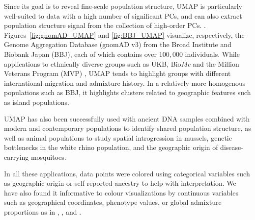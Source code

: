 \documentclass[12pt]{article}
\begin{document}
Since its goal is to reveal fine-scale population structure, UMAP is particularly well-suited to data with a high number of significant PCs, and can also extract population structure signal from the collection of high-order PCs. \cite{diaz-papkovich_umap_2019}.  Figures~\ref{fig:gnomAD_UMAP} and \ref{fig:BBJ_UMAP} visualize, respectively, the Genome Aggregation Database (gnomAD v3) from the Broad Institute\cite{karczewski_mutational_2020} and Biobank Japan (BBJ)\cite{nagai2017overview}\cite{sakaue_dimensionality_2020}, each of which contains over $100,000$ individuals. While applications to ethnically diverse groups such as UKB, Bio\textit{Me}\cite{belbin_towards_2019} and the Million Veterans Program (MVP) \cite{hunter-zinck_genotyping_2020}, UMAP tends to highlight groups with different international migration and admixture history. In a relatively more homogenous populations such as BBJ, it highlights clusters related to geographic features such as island populations.

UMAP has also been successfully used with ancient DNA samples combined with modern and contemporary populations to identify shared population structure\cite{margaryan_population_2019}, as well as animal populations to study spatial introgression in mussels\cite{simon_local_2019}, genetic bottlenecks in the white rhino population\cite{sanchez-barreiro_historical_2020}, and the geographic origin of disease-carrying mosquitoes\cite{consortium_genome_2020}\cite{schmidt2020population}. 

In all these applications, data points were colored using categorical variables such as geographic origin or self-reported ancestry to help with interpretation. We have also found it informative to colour visualizations by continuous variables such as geographical coordinates, phenotype values, or global admixture proportions as in \cite{diaz-papkovich_umap_2019}, \cite{dai_population_2020}, and \cite{spear2020recent}.
\end{document}
